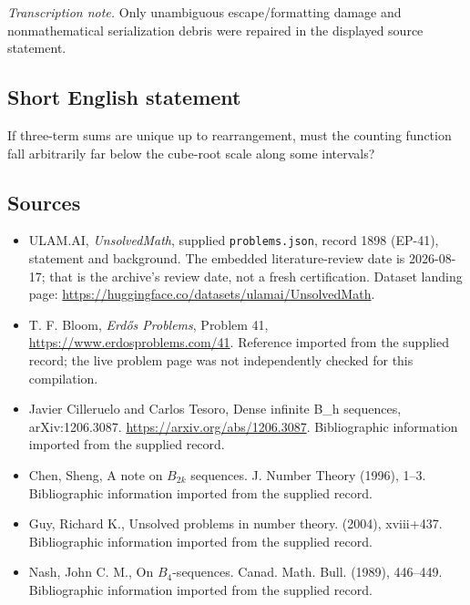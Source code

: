\documentclass[11pt,a4paper]{article}
\begin{document}
{\small\emph{Transcription note.} Only unambiguous escape/formatting damage and nonmathematical serialization debris were repaired in the displayed source statement.}

\subsection{Short English statement}

If three-term sums are unique up to rearrangement, must the counting function fall arbitrarily far below the cube-root scale along some intervals?

\subsection{Sources}

{\small

\begin{itemize}

\item[\hypertarget{source:1898:1}{S1}] ULAM.AI, \emph{UnsolvedMath}, supplied \texttt{problems.json}, record 1898 (EP-41), statement and background. The embedded literature-review date is 2026-08-17; that is the archive’s review date, not a fresh certification. Dataset landing page: \url{https://huggingface.co/datasets/ulamai/UnsolvedMath}.

\item[\hypertarget{source:1898:2}{S2}] T. F. Bloom, \emph{Erdős Problems}, Problem 41, \url{https://www.erdosproblems.com/41}. Reference imported from the supplied record; the live problem page was not independently checked for this compilation.

\item[\hypertarget{source:1898:3}{S3}] Javier Cilleruelo and Carlos Tesoro, Dense infinite B\_h sequences, arXiv:1206.3087. \url{https://arxiv.org/abs/1206.3087}. Bibliographic information imported from the supplied record.

\item[\hypertarget{source:1898:4}{S4}] Chen, Sheng, A note on {$B_{2k}$} sequences. J. Number Theory (1996), 1--3. Bibliographic information imported from the supplied record.

\item[\hypertarget{source:1898:5}{S5}] Guy, Richard K., Unsolved problems in number theory. (2004), xviii+437. Bibliographic information imported from the supplied record.

\item[\hypertarget{source:1898:6}{S6}] Nash, John C. M., On {$B_4$}-sequences. Canad. Math. Bull. (1989), 446--449. Bibliographic information imported from the supplied record.

\end{itemize}

}

\label{end:1898}
\end{document}
